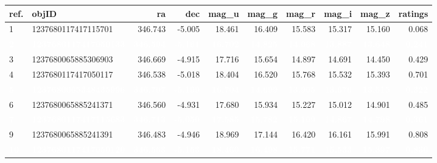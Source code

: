 \documentclass[]{elsarticle} %
\begin{document}
\begin{table}[H]
\centering
\begin{tabular}{l|l|r|r|r|r|r|r|r|r}
\hline
ref. & objID & ra & dec & mag\_u & mag\_g & mag\_r & mag\_i & mag\_z & ratings\\
\hline
1 & 1237680117417115701 & 346.743 & -5.005 & 18.461 & 16.409 & 15.583 & 15.317 & 15.160 & 0.068\\
\hline
\rowcolor[HTML]{D7261E}  \textcolor{white}{\textbf{2}} & \textcolor{white}{\textbf{1237680117417050133}} & \textcolor{white}{\textbf{346.594}} & \textcolor{white}{\textbf{-5.161}} & \textcolor{white}{\textbf{16.702}} & \textcolor{white}{\textbf{14.825}} & \textcolor{white}{\textbf{14.068}} & \textcolor{white}{\textbf{13.887}} & \textcolor{white}{\textbf{13.648}} & \textcolor{white}{\textbf{0.241}}\\
\hline
3 & 1237680065885306903 & 346.669 & -4.915 & 17.716 & 15.654 & 14.897 & 14.691 & 14.450 & 0.429\\
\hline
4 & 1237680117417050117 & 346.538 & -5.018 & 18.404 & 16.520 & 15.768 & 15.532 & 15.393 & 0.701\\
\hline
\rowcolor[HTML]{D7261E}  \textcolor{white}{\textbf{5}} & \textcolor{white}{\textbf{1237680065348435996}} & \textcolor{white}{\textbf{346.707}} & \textcolor{white}{\textbf{-5.199}} & \textcolor{white}{\textbf{16.704}} & \textcolor{white}{\textbf{14.699}} & \textcolor{white}{\textbf{13.905}} & \textcolor{white}{\textbf{13.676}} & \textcolor{white}{\textbf{13.515}} & \textcolor{white}{\textbf{0.322}}\\
\hline
6 & 1237680065885241371 & 346.560 & -4.931 & 17.680 & 15.934 & 15.227 & 15.012 & 14.901 & 0.485\\
\hline
\rowcolor[HTML]{D7261E}  \textcolor{white}{\textbf{7}} & \textcolor{white}{\textbf{1237680117417115683}} & \textcolor{white}{\textbf{346.713}} & \textcolor{white}{\textbf{-5.050}} & \textcolor{white}{\textbf{17.585}} & \textcolor{white}{\textbf{15.782}} & \textcolor{white}{\textbf{15.109}} & \textcolor{white}{\textbf{14.867}} & \textcolor{white}{\textbf{14.798}} & \textcolor{white}{\textbf{0.361}}\\
\hline
9 & 1237680065885241391 & 346.483 & -4.946 & 18.969 & 17.144 & 16.420 & 16.161 & 15.991 & 0.808\\
\hline
\rowcolor[HTML]{D7261E}  \textcolor{white}{\textbf{10}} & \textcolor{white}{\textbf{1237680117417050120}} & \textcolor{white}{\textbf{346.563}} & \textcolor{white}{\textbf{-5.153}} & \textcolor{white}{\textbf{18.460}} & \textcolor{white}{\textbf{16.498}} & \textcolor{white}{\textbf{15.771}} & \textcolor{white}{\textbf{15.533}} & \textcolor{white}{\textbf{15.397}} & \textcolor{white}{\textbf{0.830}}\\

\end{tabular}
\end{table}
\end{document}
